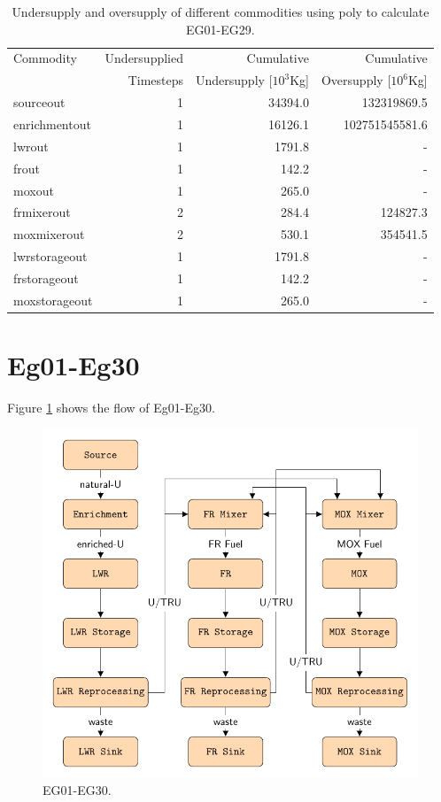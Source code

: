 \documentclass[11pt]{article}
\begin{document}
\begin{table}[H]
	\centering
	\caption{Undersupply and oversupply of different commodities using poly to calculate EG01-EG29.}
	\label{tab:29-commod}
	\begin{tabularx}{\textwidth}{lRRR}
		\hline
		Commodity & Undersupplied & Cumulative  & Cumulative \\
		& Timesteps & Undersupply [$10^3$Kg]  & Oversupply [$10^6$Kg] \\ \hline
		sourceout & 1 & 34394.0  & 132319869.5 \\ 
		enrichmentout & 1 & 16126.1 & 102751545581.6 \\

		lwrout & 1 & 1791.8 & - \\
		frout & 1 & 142.2 & - \\
		moxout & 1 & 265.0 & - \\

		frmixerout & 2 & 284.4 & 124827.3 \\
        moxmixerout & 2 & 530.1 & 354541.5 \\

		lwrstorageout & 1 & 1791.8 & - \\
		frstorageout & 1 & 142.2 & - \\
		moxstorageout & 1 & 265.0 & - \\ \hline
	\end{tabularx}
\end{table}

\section{Eg01-Eg30}

Figure \ref{fig:30flow} shows the flow of Eg01-Eg30.

\begin{figure}[H]
	\centering
	\includegraphics[width=\textwidth]{30-figures/30flow.pdf} 
	\hfill
	\caption{EG01-EG30.}
	\label{fig:30flow}
\end{figure}
\end{document}
